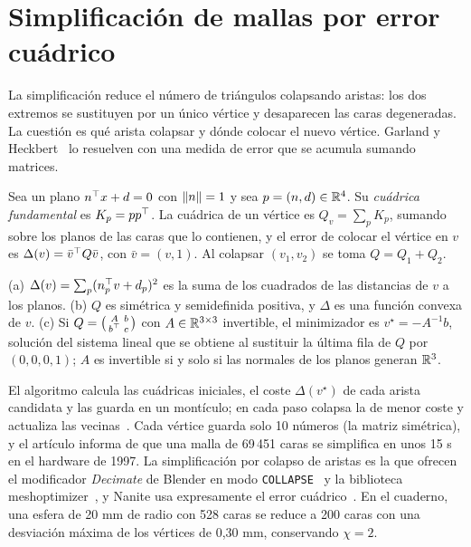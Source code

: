 \section{Simplificación de mallas por error cuádrico}

La simplificación reduce el número de triángulos colapsando aristas: los dos extremos se sustituyen por un único vértice y desaparecen las caras degeneradas. La cuestión es qué arista colapsar y dónde colocar el nuevo vértice. Garland y Heckbert~\cite{garland} lo resuelven con una medida de error que se acumula sumando matrices.

\begin{definicion}\label{def:cuadrica}
Sea un plano $n^\top x+d=0$ con $\lVert n\rVert=1$ y sea $p=(n,d)\in\mathbb{R}^4$. Su \emph{cuádrica fundamental} es $K_p=pp^\top$. La cuádrica de un vértice es $Q_v=\sum_pK_p$, sumando sobre los planos de las caras que lo contienen, y el error de colocar el vértice en $v$ es $\Delta(v)=\bar v^\top Q\bar v$, con $\bar v=(v,1)$. Al colapsar $(v_1,v_2)$ se toma $Q=Q_1+Q_2$.
\end{definicion}

\begin{proposicion}\label{prop:qem}
(a) $\Delta(v)=\sum_p(n_p^\top v+d_p)^2$ es la suma de los cuadrados de las distancias de $v$ a los planos. (b) $Q$ es simétrica y semidefinida positiva, y $\Delta$ es una función convexa de $v$. (c) Si $Q=\begin{psmallmatrix}A&b\\b^\top&c\end{psmallmatrix}$ con $A\in\mathbb{R}^{3\times3}$ invertible, el minimizador es $v^\star=-A^{-1}b$, solución del sistema lineal que se obtiene al sustituir la última fila de $Q$ por $(0,0,0,1)$; $A$ es invertible si y solo si las normales de los planos generan $\mathbb{R}^3$.
\end{proposicion}

\addtocounter{definicion}{1}%

El algoritmo calcula las cuádricas iniciales, el coste $\Delta(v^\star)$ de cada arista candidata y las guarda en un montículo; en cada paso colapsa la de menor coste y actualiza las vecinas~\cite[§4.1]{garland}. Cada vértice guarda solo 10 números (la matriz simétrica), y el artículo informa de que una malla de 69\,451 caras se simplifica en unos 15 s en el hardware de 1997. La simplificación por colapso de aristas es la que ofrecen el modificador \emph{Decimate} de Blender en modo \texttt{COLLAPSE}~\cite{blenderapi} y la biblioteca meshoptimizer~\cite{meshopt}, y Nanite usa expresamente el error cuádrico~\cite{nanite}. En el cuaderno, una esfera de 20 mm de radio con 528 caras se reduce a 200 caras con una desviación máxima de los vértices de 0,30 mm, conservando $\chi=2$.

